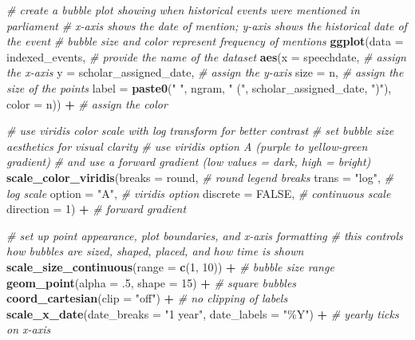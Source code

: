 \documentclass[
]{article}
\newenvironment{Shaded}{\begin{snugshade}}{\end{snugshade}}
\newcommand{\AttributeTok}[1]{\textcolor[rgb]{0.13,0.29,0.53}{#1}}
\newcommand{\CommentTok}[1]{\textcolor[rgb]{0.56,0.35,0.01}{\textit{#1}}}
\newcommand{\ConstantTok}[1]{\textcolor[rgb]{0.56,0.35,0.01}{#1}}
\newcommand{\DecValTok}[1]{\textcolor[rgb]{0.00,0.00,0.81}{#1}}
\newcommand{\FunctionTok}[1]{\textcolor[rgb]{0.13,0.29,0.53}{\textbf{#1}}}
\newcommand{\NormalTok}[1]{#1}
\newcommand{\SpecialCharTok}[1]{\textcolor[rgb]{0.81,0.36,0.00}{\textbf{#1}}}
\newcommand{\StringTok}[1]{\textcolor[rgb]{0.31,0.60,0.02}{#1}}
\begin{document}
\begin{Shaded}
\begin{Highlighting}[]
\CommentTok{\# create a bubble plot showing when historical events were mentioned in parliament}
\CommentTok{\# x{-}axis shows the date of mention; y{-}axis shows the historical date of the event}
\CommentTok{\# bubble size and color represent frequency of mentions}
\FunctionTok{ggplot}\NormalTok{(}\AttributeTok{data =}\NormalTok{ indexed\_events, }\CommentTok{\# provide the name of the dataset}
       \FunctionTok{aes}\NormalTok{(}\AttributeTok{x =}\NormalTok{ speechdate, }\CommentTok{\# assign the x{-}axis}
           \AttributeTok{y =}\NormalTok{ scholar\_assigned\_date, }\CommentTok{\# assign the y{-}axis}
           \AttributeTok{size =}\NormalTok{ n, }\CommentTok{\# assign the size of the points}
           \AttributeTok{label =} \FunctionTok{paste0}\NormalTok{(}\StringTok{"            "}\NormalTok{, ngram, }\StringTok{" ("}\NormalTok{, scholar\_assigned\_date, }\StringTok{")"}\NormalTok{),}
           \AttributeTok{color =}\NormalTok{ n)) }\SpecialCharTok{+}  \CommentTok{\# assign the color}

\CommentTok{\# use viridis color scale with log transform for better contrast}
\CommentTok{\# set bubble size aesthetics for visual clarity}
\CommentTok{\# use viridis option A (purple to yellow{-}green gradient)}
\CommentTok{\# and use a forward gradient (low values = dark, high = bright)}
  \FunctionTok{scale\_color\_viridis}\NormalTok{(}\AttributeTok{breaks =}\NormalTok{ round, }\CommentTok{\# round legend breaks}
                    \AttributeTok{trans =} \StringTok{"log"}\NormalTok{, }\CommentTok{\# log scale}
                    \AttributeTok{option =} \StringTok{"A"}\NormalTok{, }\CommentTok{\# viridis option}
                    \AttributeTok{discrete =} \ConstantTok{FALSE}\NormalTok{, }\CommentTok{\# continuous scale}
                    \AttributeTok{direction =} \DecValTok{1}\NormalTok{) }\SpecialCharTok{+} \CommentTok{\# forward gradient}

  \CommentTok{\# set up point appearance, plot boundaries, and x{-}axis formatting}
  \CommentTok{\# this controls how bubbles are sized, shaped, placed, and how time is shown}
  \FunctionTok{scale\_size\_continuous}\NormalTok{(}\AttributeTok{range =} \FunctionTok{c}\NormalTok{(}\DecValTok{1}\NormalTok{, }\DecValTok{10}\NormalTok{)) }\SpecialCharTok{+} \CommentTok{\# bubble size range}
  \FunctionTok{geom\_point}\NormalTok{(}\AttributeTok{alpha =}\NormalTok{ .}\DecValTok{5}\NormalTok{, }\AttributeTok{shape =} \DecValTok{15}\NormalTok{) }\SpecialCharTok{+} \CommentTok{\# square bubbles}
  \FunctionTok{coord\_cartesian}\NormalTok{(}\AttributeTok{clip =} \StringTok{"off"}\NormalTok{) }\SpecialCharTok{+} \CommentTok{\# no clipping of labels}
  \FunctionTok{scale\_x\_date}\NormalTok{(}\AttributeTok{date\_breaks =} \StringTok{"1 year"}\NormalTok{, }\AttributeTok{date\_labels =} \StringTok{"\%Y"}\NormalTok{) }\SpecialCharTok{+} \CommentTok{\# yearly ticks on x{-}axis}


\end{Highlighting}
\end{Shaded}
\end{document}
